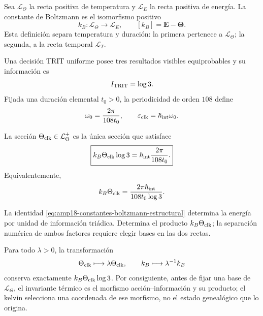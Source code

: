 Sea \(\mathcal L_\Theta\) la recta positiva de temperatura y
\(\mathcal L_E\) la recta positiva de energía. La constante de Boltzmann es
el isomorfismo positivo
\begin{equation}
 \label{eq:amp18-constantes-boltzmann-morfismo}
 k_B:\mathcal L_\Theta\longrightarrow\mathcal L_E,
 \qquad [k_B]=\mathbf E-\boldsymbol\Theta.
\end{equation}
Esta definición separa temperatura y duración: la primera pertenece a
\(\mathcal L_\Theta\); la segunda, a la recta temporal
\(\mathcal L_T\).

Una decisión TRIT uniforme posee tres resultados visibles equiprobables y su
información es
\begin{equation}
 \label{eq:amp18-constantes-info-trit}
 I_{\rm TRIT}=\log3.
\end{equation}
Fijada una duración elemental \(t_0>0\), la periodicidad de orden \(108\)
define
\begin{equation}
 \label{eq:amp18-constantes-reloj-boltzmann}
 \omega_0=\frac{2\pi}{108t_0},
 \qquad
 \varepsilon_{\rm clk}=\hbar_{\rm int}\omega_0.
\end{equation}

\begin{definition}
La sección \(\Theta_{\rm clk}\in\mathcal L_\Theta^+\) es la única sección
que satisface
\begin{equation}
 \label{eq:amp18-constantes-boltzmann-estructural}
 \boxed{
 k_B\Theta_{\rm clk}\log3
 =\hbar_{\rm int}\frac{2\pi}{108t_0}.}
\end{equation}
Equivalentemente,
\[
 k_B\Theta_{\rm clk}
 =\frac{2\pi\hbar_{\rm int}}{108t_0\log3}.
\]
\end{definition}

La identidad \eqref{eq:amp18-constantes-boltzmann-estructural} determina la
energía por unidad de información triádica. Determina el producto
\(k_B\Theta_{\rm clk}\); la separación numérica de ambos factores requiere
elegir bases en las dos rectas.

\begin{proposition}
\label{prop:amp18-constantes-covariancia-termica}
Para todo \(\lambda>0\), la transformación
\[
 \Theta_{\rm clk}\longmapsto\lambda\Theta_{\rm clk},\qquad
 k_B\longmapsto\lambda^{-1}k_B
\]
conserva exactamente
\(k_B\Theta_{\rm clk}\log3\). Por consiguiente, antes de fijar una base de
\(\mathcal L_\Theta\), el invariante térmico es el morfismo
acción--información y su producto; el kelvin selecciona una coordenada de
ese morfismo, no el estado genealógico que lo origina.
\end{proposition}


